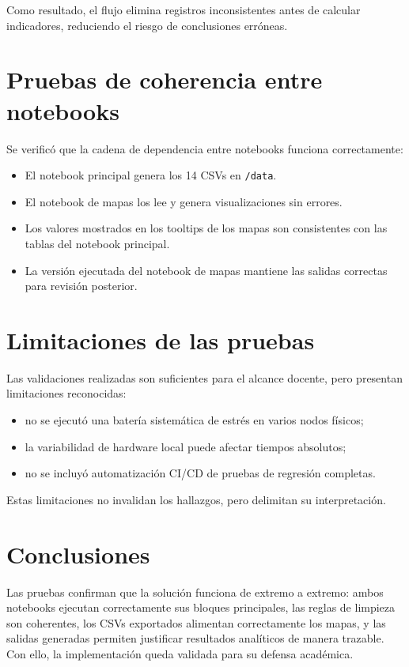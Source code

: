 Como resultado, el flujo elimina registros inconsistentes antes de calcular
indicadores, reduciendo el riesgo de conclusiones erróneas.

\section{Pruebas de coherencia entre notebooks}
Se verificó que la cadena de dependencia entre notebooks funciona correctamente:

\begin{itemize}
	\item El notebook principal genera los 14 CSVs en \texttt{/data}.
	\item El notebook de mapas los lee y genera visualizaciones sin errores.
	\item Los valores mostrados en los tooltips de los mapas son consistentes
	con las tablas del notebook principal.
	\item La versión ejecutada del notebook de mapas mantiene las salidas
	correctas para revisión posterior.
\end{itemize}

\section{Limitaciones de las pruebas}
Las validaciones realizadas son suficientes para el alcance docente, pero presentan
limitaciones reconocidas:

\begin{itemize}
	\item no se ejecutó una batería sistemática de estrés en varios nodos físicos;
	\item la variabilidad de hardware local puede afectar tiempos absolutos;
	\item no se incluyó automatización CI/CD de pruebas de regresión completas.
\end{itemize}

Estas limitaciones no invalidan los hallazgos, pero delimitan su interpretación.

\section{Conclusiones}
Las pruebas confirman que la solución funciona de extremo a extremo: ambos notebooks
ejecutan correctamente sus bloques principales, las reglas de limpieza son coherentes,
los CSVs exportados alimentan correctamente los mapas, y las salidas generadas permiten
justificar resultados analíticos de manera trazable. Con ello, la implementación queda
validada para su defensa académica.